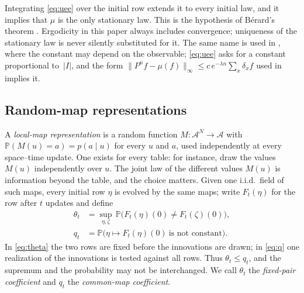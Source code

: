 \documentclass[11pt]{article}
\theoremstyle{plain}
\theoremstyle{definition}
\theoremstyle{remark}
\newcommand{\A}{\mathcal{A}}
\newcommand{\Prob}{\mathbb{P}}
\begin{document}
Integrating \eqref{eq:uee} over the initial row extends it to every initial law, and it implies that $\mu$ is the only stationary law. This is the hypothesis of B\'erard's theorem \cite[eq.~(4)]{Berard23}. Ergodicity in this paper always includes convergence; uniqueness of the stationary law is never silently substituted for it. The same name is used in \cite[Definition~3]{MS91}, where the constant may depend on the observable; \eqref{eq:uee} asks for a constant proportional to~$|I|$, and the form $\|P^nf-\mu(f)\|_\infty\le c\,e^{-\lambda n}\sum_x\delta_xf$ used in \cite[Theorem~2]{MS91} implies it.

\subsection{Random-map representations}

A \emph{local-map representation} is a random function $M\colon\A^{N}\to\A$ with $\Prob(M(u)=a)=p(a\mid u)$ for every $u$ and $a$, used independently at every space--time update. One exists for every table: for instance, draw the values $M(u)$ independently over $u$. The joint law of the different values $M(u)$ is information beyond the table, and the choice matters. Given one i.i.d.\ field of such maps, every initial row $\eta$ is evolved by the same maps; write $F_t(\eta)$ for the row after $t$ updates and define
\begin{align}
\theta_t&=\sup_{\eta,\zeta}\,\Prob\bigl(F_t(\eta)(0)\neq F_t(\zeta)(0)\bigr),\label{eq:theta}\\
q_t&=\Prob\bigl(\eta\mapsto F_t(\eta)(0)\ \text{is not constant}\bigr).\label{eq:q}
\end{align}
In \eqref{eq:theta} the two rows are fixed before the innovations are drawn; in \eqref{eq:q} one realization of the innovations is tested against all rows. Thus $\theta_t\le q_t$, and the supremum and the probability may not be interchanged. We call $\theta_t$ the \emph{fixed-pair coefficient} and $q_t$ the \emph{common-map coefficient}.
\end{document}
